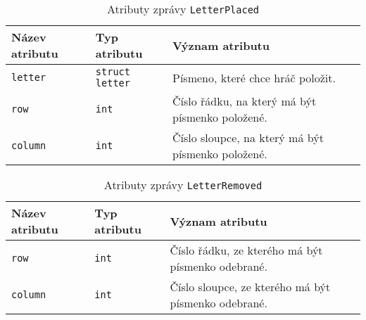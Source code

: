 \documentclass[12pt, a4paper]{article}
\begin{document}
		
\begin{center}
		\begin{table}[!ht]
		     \caption{Atributy zprávy \texttt{LetterPlaced}}
		\begin{tabularx}{\textwidth}{|l|l|X|}
			\hline
			\textbf{Název atributu} & \textbf{Typ atributu} & \textbf{Význam atributu} \\ 
			\hline
			\texttt{letter}          &\texttt{struct letter}&Písmeno, které chce hráč položit.\\
			\hline
			\texttt{row}          &\texttt{int}&Číslo řádku, na který má být písmenko položené.\\
			\hline
			\texttt{column}          &\texttt{int}&Číslo sloupce, na který má být písmenko položené.\\
			\hline
		\end{tabularx}
		\end{table}
\end{center}


\begin{center}
		\begin{table}[!ht]
		     \caption{Atributy zprávy \texttt{LetterRemoved}}
		\begin{tabularx}{\textwidth}{|l|l|X|}
			\hline
			\textbf{Název atributu} & \textbf{Typ atributu} & \textbf{Význam atributu} \\ 
			\hline
			\texttt{row}          &\texttt{int}&Číslo řádku, ze kterého má být písmenko odebrané.\\
			\hline
			\texttt{column}          &\texttt{int}&Číslo sloupce, ze kterého má být písmenko odebrané.\\
			\hline
		\end{tabularx}
		\end{table}
\end{center}  		
\end{document}
